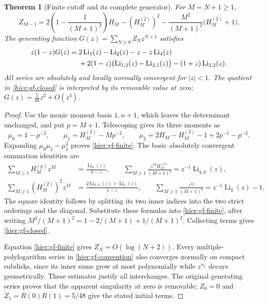\documentclass[11pt]{article}
\newtheorem{theorem}{Theorem}[section]
\theoremstyle{definition}
\theoremstyle{remark}
\numberwithin{equation}{section}
\begin{document}
\begin{theorem}[Finite cutoff and its complete generator]
\label{hier:gf-theorem}
For $M=N+1\ge1$,
\begin{equation}\label{hier:gf-finite}
 \boxed{\displaystyle
 Z_{M-1}=
 2\left(1-\frac1{(M+1)^2}\right)H_M
 -(H_M^{(2)})^2
 -\frac{M^2}{(M+1)^2}\bigl(H_M^{(2)}+1\bigr).}
\end{equation}
The generating function $G(z)=\sum_{N\ge0}Z_Nz^{N+1}$ satisfies
\begin{align}\label{hier:gf-closed}
 z(1-z)G(z)={}&2\operatorname{Li}_1(z)-\operatorname{Li}_2(z)
                 -z-z\operatorname{Li}_4(z)\notag\\
 &+2(1-z)\bigl(\operatorname{Li}_{1,2}(z)
                         -\operatorname{Li}_{2,1}(z)\bigr)
 -(1+z)\operatorname{Li}_{2,2}(z).
\end{align}
All series are absolutely and locally normally convergent for $|z|<1$.
The quotient in \eqref{hier:gf-closed} is interpreted by its removable
value at zero; $G(z)=\tfrac5{48}z^2+O(z^3)$.
\end{theorem}
\begin{proof}
Use the monic moment basis $1,n+1$, which leaves the determinant
unchanged, and put $p=M+1$.  Telescoping gives its three moments as
\[
 \mu_0=1-p^{-2},\qquad
 \mu_1=H_M^{(2)}-Mp^{-2},\qquad
 \mu_2=2H_M-H_M^{(2)}-1+2p^{-1}-p^{-2}.
\]
Expanding $\mu_0\mu_2-\mu_1^2$ proves \eqref{hier:gf-finite}.
The basic absolutely convergent summation identities are
\begin{align*}
 \sum_{M\ge1}H_M^{(p)}z^M
    &=\frac{\operatorname{Li}_p(z)}{1-z},\qquad
 \sum_{M\ge1}\frac{z^M H_M^{(p)}}{(M+1)^q}
    =z^{-1}\operatorname{Li}_{q,p}(z),\\
 \sum_{M\ge1}(H_M^{(2)})^2z^M
    &=\frac{2\operatorname{Li}_{2,2}(z)+\operatorname{Li}_4(z)}{1-z},
 \qquad
 \sum_{M\ge1}\frac{z^M}{(M+1)^q}
    =z^{-1}\operatorname{Li}_q(z)-1.
\end{align*}
The square identity follows by splitting its two inner indices into
the two strict orderings and the diagonal.  Substitute these formulas
into \eqref{hier:gf-finite}, after writing
$M^2/(M+1)^2=1-2/(M+1)+1/(M+1)^2$.  Collecting terms gives
\eqref{hier:gf-closed}.

Equation \eqref{hier:gf-finite} gives $Z_N=O(\log(N+2))$.
Every multiple-polylogarithm series in \eqref{hier:gf-convention}
also converges normally on compact subdisks, since its inner sums
grow at most polynomially while $z^{n_1}$ decays geometrically.
These estimates justify all interchanges.  The original generating
series proves that the apparent singularity at zero is removable;
$Z_0=0$ and $Z_1=R(0)R(1)=5/48$ give the stated initial terms.
\end{proof}
\end{document}

